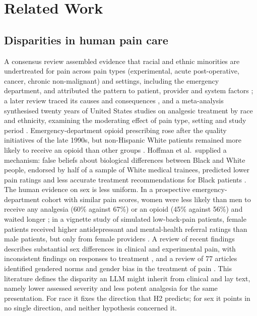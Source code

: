 \section{Related Work}
\label{sec:related}

\subsection{Disparities in human pain care}
A consensus review assembled evidence that racial and ethnic minorities are
undertreated for pain across pain types (experimental, acute post-operative,
cancer, chronic non-malignant) and settings, including the emergency department,
and attributed the pattern to patient, provider and system factors
\cite{green2003unequal}; a later review traced its causes and consequences
\cite{anderson2009racial}, and a meta-analysis synthesised twenty years of
United States studies on analgesic treatment by race and ethnicity, examining
the moderating effect of pain type, setting and study period
\cite{meghani2012time}. Emergency-department opioid prescribing rose after the
quality initiatives of the late 1990s, but non-Hispanic White patients remained
more likely to receive an opioid than other groups \cite{pletcher2008trends}.
Hoffman et al.\ supplied a mechanism: false beliefs about biological differences
between Black and White people, endorsed by half of a sample of White medical
trainees, predicted lower pain ratings and less accurate treatment
recommendations for Black patients \cite{hoffman2016racial}. The human evidence
on sex is less uniform. In a prospective emergency-department cohort with similar
pain scores, women were less likely than men to receive any analgesia (60\%
against 67\%) or an opioid (45\% against 56\%) and waited longer
\cite{chen2008gender}; in a vignette study of simulated low-back-pain patients,
female patients received higher antidepressant and mental-health referral ratings
than male patients, but only from female providers \cite{hirsh2014influence}. A
review of recent findings describes substantial sex differences in clinical and
experimental pain, with inconsistent findings on responses to treatment
\cite{fillingim2009sex}, and a review of 77 articles identified gendered norms and
gender bias in the treatment of pain \cite{samulowitz2018brave}. This literature
defines the disparity an LLM might inherit from clinical and lay text, namely
lower assessed severity and less potent analgesia for the same presentation. For
race it fixes the direction that H2 predicts; for sex it points in no single
direction, and neither hypothesis concerned it.

